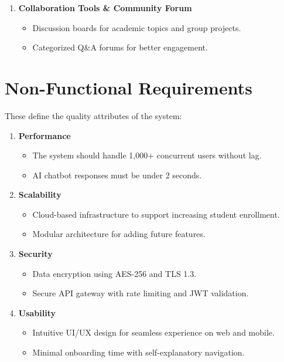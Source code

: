 \begin{enumerate}
    \item \textbf{Collaboration Tools \& Community Forum}
    \begin{itemize}
        \item Discussion boards for academic topics and group projects.
        \item Categorized Q\&A forums for better engagement.
    \end{itemize}
\end{enumerate}

\section{Non-Functional Requirements}

These define the quality attributes of the system:

\begin{enumerate}
    \item \textbf{Performance}
    \begin{itemize}
        \item The system should handle 1,000+ concurrent users without lag.
        \item AI chatbot responses must be under 2 seconds.
    \end{itemize}

    \item \textbf{Scalability}
    \begin{itemize}
        \item Cloud-based infrastructure to support increasing student enrollment.
        \item Modular architecture for adding future features.
    \end{itemize}

    \item \textbf{Security}
    \begin{itemize}
        \item Data encryption using AES-256 and TLS 1.3.
        \item Secure API gateway with rate limiting and JWT validation.
    \end{itemize}

    \item \textbf{Usability}
    \begin{itemize}
        \item Intuitive UI/UX design for seamless experience on web and mobile.
        \item Minimal onboarding time with self-explanatory navigation.
    \end{itemize}


\end{enumerate}
